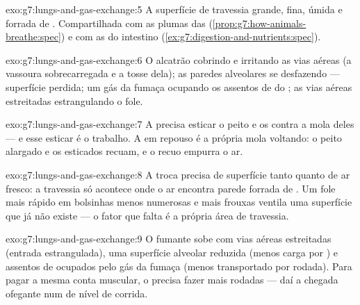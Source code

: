 \begin{solution}{exo:g7:lungs-and-gas-exchange:5}
A superfície de travessia grande, fina, úmida e forrada de .
Compartilhada com as plumas das 
(\cref{prop:g7:how-animals-breathe:spec}) e com as  do
intestino (\cref{ex:g7:digestion-and-nutrients:spec}).
\end{solution}

\begin{solution}{exo:g7:lungs-and-gas-exchange:6}
O alcatrão cobrindo e irritando as vias aéreas (a vassoura
sobrecarregada e a tosse dela); as paredes alveolares se desfazendo
--- superfície perdida; um gás da fumaça ocupando os assentos de
 do ; as vias aéreas estreitadas estrangulando o fole.
\end{solution}

\begin{solution}{exo:g7:lungs-and-gas-exchange:7}
A  precisa esticar o peito e os  contra a mola deles
--- e esse esticar é o trabalho. A  em repouso é a própria
mola voltando: o peito alargado e os  esticados recuam, e o
recuo empurra o ar.
\end{solution}

\begin{solution}{exo:g7:lungs-and-gas-exchange:8}
A troca precisa de superfície tanto quanto de ar fresco: a travessia
só acontece onde o ar encontra parede forrada de . Um fole mais
rápido em bolsinhas menos numerosas e mais frouxas ventila uma
superfície que já não existe --- o fator que falta é a própria área de
travessia.
\end{solution}

\begin{solution}{exo:g7:lungs-and-gas-exchange:9}
O fumante sobe com vias aéreas estreitadas (entrada estrangulada), uma
superfície alveolar reduzida (menos carga por ) e assentos
de  ocupados pelo gás da fumaça (menos transportado por
rodada). Para pagar a mesma conta muscular, o  precisa fazer
mais rodadas --- daí a chegada ofegante num  de nível de corrida.
\end{solution}

